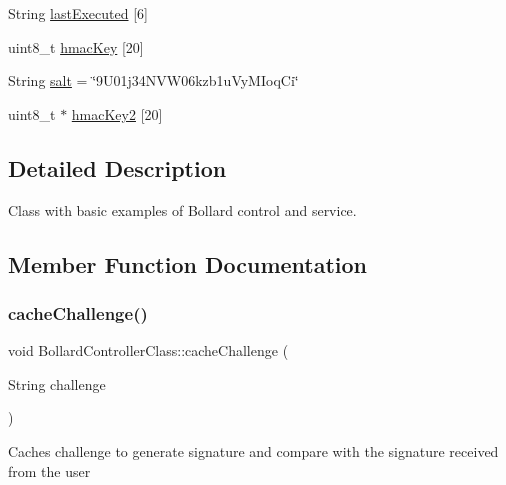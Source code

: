 \begin{DoxyCompactItemize}
String \mbox{\hyperlink{class_bollard_controller_class_a9d2d94e426e1591c07b7dc0e068133ac}{last\+Executed}} \mbox{[}6\mbox{]}
\item 
uint8\+\_\+t \mbox{\hyperlink{class_bollard_controller_class_af0aff575e5183c82913f1f0d3370a770}{hmac\+Key}} \mbox{[}20\mbox{]}
\item 
String \mbox{\hyperlink{class_bollard_controller_class_a00641ae780ce3476dbd3ed2c2c4f097a}{salt}} = \char`\"{}9\+U01j34\+N\+V\+W06kzb1u\+Vy\+M\+Ioq\+Ci\char`\"{}
\item 
uint8\+\_\+t $\ast$ \mbox{\hyperlink{class_bollard_controller_class_acc115b72127ce9817cafddc86e70000a}{hmac\+Key2}} \mbox{[}20\mbox{]}
\end{DoxyCompactItemize}


\subsection{Detailed Description}
Class with basic examples of Bollard control and service. 

\subsection{Member Function Documentation}
\mbox{\label{class_bollard_controller_class_a12b211bbbaf0ef839aba053b48bb990e}} 
\subsubsection{\texorpdfstring{cache\+Challenge()}{cacheChallenge()}}
{\footnotesize\ttfamily void Bollard\+Controller\+Class\+::cache\+Challenge (\begin{DoxyParamCaption}\item[{String}]{challenge }\end{DoxyParamCaption})\hspace{0.3cm}{\ttfamily [private]}}

Caches challenge to generate signature and compare with the signature received from the user \mbox{\label{class_bollard_controller_class_a129eac34669458631c2c235c9c01a2fb}} 
